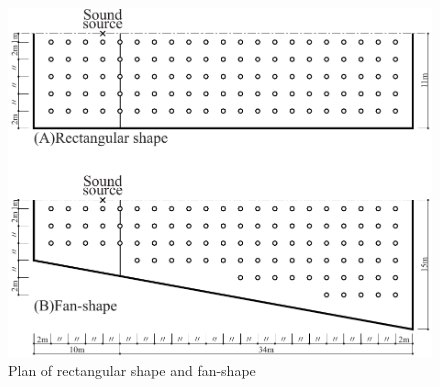\begin{figure}[H]
    \centering
    \includegraphics[keepaspectratio,scale=0.99]{02_att/rec_fan_zumen_2.pdf}
    \caption{\hspace{1mm}Plan of rectangular shape and fan-shape}
    \label{fig:(A)矩形モデル及び(B)扇形モデル平面図}
\end{figure}

